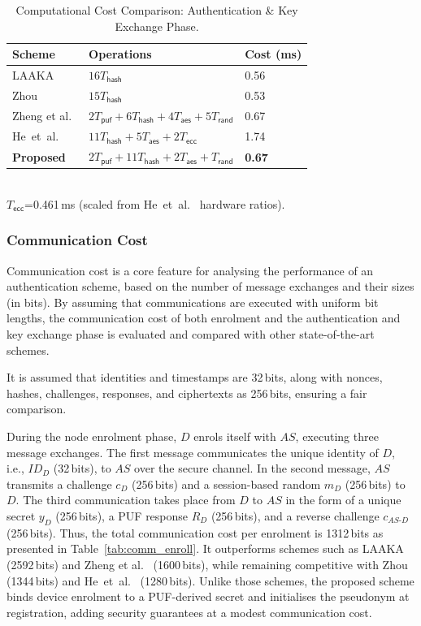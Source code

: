 \documentclass[conference]{IEEEtran}
\begin{document}
\begin{table}[!t]
  \centering
  \caption{Computational Cost Comparison: Authentication \& Key Exchange Phase.}
  \label{tab:comp_auth}
  \scriptsize
  \setlength{\tabcolsep}{3pt}
  \begin{tabular}{lll}
    \toprule
    Scheme & Operations & Cost (ms) \\
    \midrule
    LAAKA~\cite{ali2024laaka}      & $16T_\mathsf{hash}$ & 0.56 \\
    Zhou~\cite{zhou2024auth}      & $15T_\mathsf{hash}$ & 0.53 \\
    Zheng et al.~\cite{zheng2022puf}      & $2T_\mathsf{puf}+6T_\mathsf{hash}+4T_\mathsf{aes}+5T_\mathsf{rand}$ & 0.67 \\
    He~et~al.~\cite{he2023lightweight}  & $11T_\mathsf{hash}+5T_\mathsf{aes}+2T_\mathsf{ecc}$ & 1.74 \\
    \textbf{Proposed}        & $2T_\mathsf{puf}+11T_\mathsf{hash}+2T_\mathsf{aes}+T_\mathsf{rand}$ & \textbf{0.67} \\
    \bottomrule
  \end{tabular}\\[3pt]
  \scriptsize
  $T_\mathsf{ecc}$=0.461\,ms (scaled from He~et~al.~\cite{he2023lightweight} hardware ratios).
\end{table}

\subsubsection{Communication Cost}

Communication cost is a core feature for analysing the performance of an authentication
scheme, based on the number of message exchanges and their sizes (in bits). By assuming
that communications are executed with uniform bit lengths, the communication cost of both
enrolment and the authentication and key exchange phase is evaluated and compared with
other state-of-the-art schemes.

It is assumed that identities and timestamps are 32\,bits, along with nonces, hashes,
challenges, responses, and ciphertexts as 256\,bits, ensuring a fair comparison.

During the node enrolment phase, $D$ enrols itself with $AS$, executing three message
exchanges. The first message communicates the unique identity of $D$, i.e., $ID_D$
(32\,bits), to $AS$ over the secure channel. In the second message, $AS$ transmits a
challenge $c_D$ (256\,bits) and a session-based random $m_D$ (256\,bits) to $D$. The
third communication takes place from $D$ to $AS$ in the form of a unique secret $y_D$
(256\,bits), a PUF response $R_D$ (256\,bits), and a reverse challenge
$c_{AS\text{-}D}$ (256\,bits). Thus, the total communication cost per enrolment is
1312\,bits as presented in Table~\ref{tab:comm_enroll}. It outperforms schemes such
as LAAKA~\cite{ali2024laaka} (2592\,bits) and Zheng et al.~\cite{zheng2022puf} (1600\,bits), while remaining
competitive with Zhou~\cite{zhou2024auth} (1344\,bits) and He~et~al.~\cite{he2023lightweight} (1280\,bits).
Unlike those schemes, the proposed scheme binds device enrolment to a PUF-derived secret and initialises
the pseudonym at registration, adding security guarantees at a modest communication cost.
\end{document}
